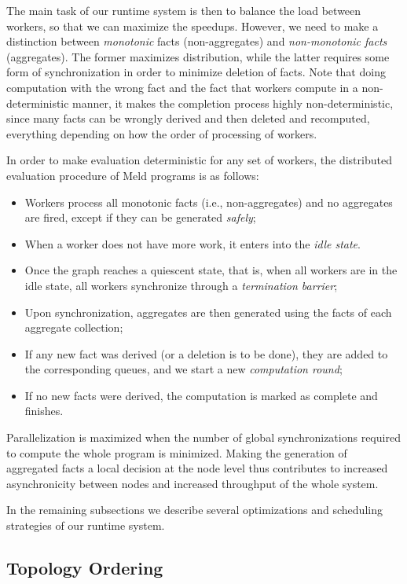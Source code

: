 \documentclass[preprint]{sigplanconf}
\begin{document}
The main task of our runtime system is then to balance the load between workers, so that we
can maximize the speedups. However, we need to make a distinction between \emph{monotonic}
facts (non-aggregates) and \emph{non-monotonic facts} (aggregates). The former maximizes
distribution, while the latter requires some form of synchronization in order to
minimize deletion of facts. Note that doing computation with the wrong fact and the fact
that workers compute in a non-deterministic manner, it makes the completion process highly
non-deterministic, since many facts can be wrongly derived and then deleted and recomputed,
everything depending on how the order of processing of workers.

In order to make evaluation deterministic for any set of workers,
the distributed evaluation procedure of Meld programs is as follows:

\begin{itemize}
   \item Workers process all monotonic facts (i.e., non-aggregates) and no aggregates are fired,
   except if they can be generated \emph{safely};
   \item When a worker does not have more work, it enters into the \emph{idle state}.
   \item Once the graph reaches a quiescent state, that is, when all workers are in
   the idle state, all workers synchronize through a \emph{termination barrier};
   \item Upon synchronization, aggregates are then generated using the facts of each
   aggregate collection;
   \item If any new fact was derived (or a deletion is to be done), they are added to the
   corresponding queues, and we start a new \emph{computation round};
   \item If no new facts were derived, the computation is marked as complete and finishes.
\end{itemize}

Parallelization is maximized when the number of global synchronizations required to compute
the whole program is minimized. Making the generation of aggregated facts a local decision
at the node level thus contributes to increased asynchronicity between nodes and increased
throughput of the whole system.

In the remaining subsections we describe several optimizations and scheduling strategies
of our runtime system.

\subsection{Topology Ordering}\label{sec:topology}
\end{document}
